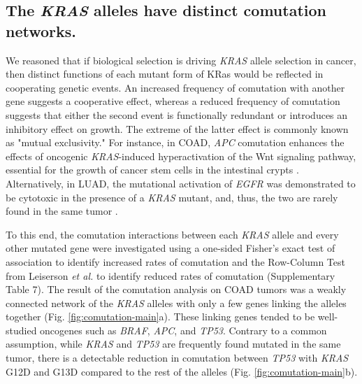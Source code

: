\documentclass[english, 10pt, letterpaper]{article}
\newcommand{\KRAS}{\emph{KRAS}}
\newcommand{\kras}{KRas}
\begin{document}
\subsection*{The \KRAS{} alleles have distinct comutation networks.}

We reasoned that if biological selection is driving \KRAS{} allele selection in cancer, then distinct functions of each mutant form of \kras{} would be reflected in cooperating genetic events. 
An increased frequency of comutation with another gene suggests a cooperative effect, whereas a reduced frequency of comutation suggests that either the second event is functionally redundant or introduces an inhibitory effect on growth.
The extreme of the latter effect is commonly known as "mutual exclusivity."
For instance, in COAD, \emph{APC} comutation enhances the effects of oncogenic \KRAS{}-induced hyperactivation of the Wnt signaling pathway, essential for the growth of cancer stem cells in the intestinal crypts \cite{Janssen2006, Fearon2014, Sakai2018, Jauhri2017}.
Alternatively, in LUAD, the mutational activation of \emph{EGFR} was demonstrated to be cytotoxic in the presence of a \KRAS{} mutant, and, thus, the two are rarely found in the same tumor \cite{Unni2015EvidenceAdenocarcinoma., Ambrogio2017InAdenocarcinoma.}.

To this end, the comutation interactions between each \KRAS{} allele and every other mutated gene were investigated using a one-sided Fisher's exact test of association to identify increased rates of comutation and the Row-Column Test from Leiserson \emph{et al.} \cite{Leiserson2016} to identify reduced rates of comutation (Supplementary Table 7).
The result of the comutation analysis on COAD tumors was a weakly connected network of the \KRAS{} alleles with only a few genes linking the alleles together (Fig. \ref{fig:comutation-main}a).
These linking genes tended to be well-studied oncogenes such as \emph{BRAF}, \emph{APC}, and \emph{TP53}.
Contrary to a common assumption, while \KRAS{} and \emph{TP53} are frequently found mutated in the same tumor, there is a detectable reduction in comutation between \emph{TP53} with \KRAS{} G12D and G13D compared to the rest of the alleles (Fig. \ref{fig:comutation-main}b).
\end{document}
